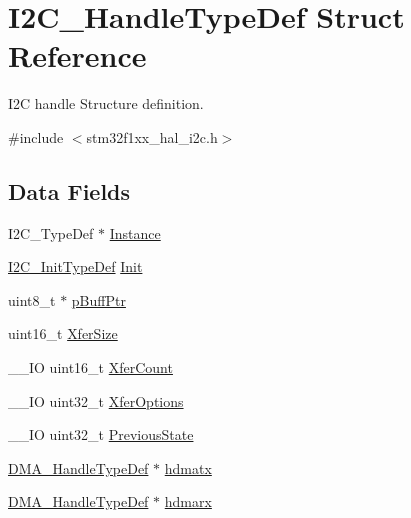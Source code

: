 \hypertarget{struct_i2_c___handle_type_def}{}\section{I2\+C\+\_\+\+Handle\+Type\+Def Struct Reference}
\label{struct_i2_c___handle_type_def}


I2C handle Structure definition.  




{\ttfamily \#include $<$stm32f1xx\+\_\+hal\+\_\+i2c.\+h$>$}

\subsection*{Data Fields}
\begin{DoxyCompactItemize}
\item 
I2\+C\+\_\+\+Type\+Def $\ast$ \hyperlink{struct_i2_c___handle_type_def_a8bdec20782b6b99587806437094c43d2}{Instance}
\item 
\hyperlink{struct_i2_c___init_type_def}{I2\+C\+\_\+\+Init\+Type\+Def} \hyperlink{struct_i2_c___handle_type_def_a4b1d65e692a280d15470a8184ed2f68a}{Init}
\item 
uint8\+\_\+t $\ast$ \hyperlink{struct_i2_c___handle_type_def_ae5b117ad14c78eb266b018fb972e315e}{p\+Buff\+Ptr}
\item 
uint16\+\_\+t \hyperlink{struct_i2_c___handle_type_def_a51999331ab800faccdb97383b39819dd}{Xfer\+Size}
\item 
\+\_\+\+\_\+\+IO uint16\+\_\+t \hyperlink{struct_i2_c___handle_type_def_a49bf3cd0e9bcb9f41f161663f513f405}{Xfer\+Count}
\item 
\+\_\+\+\_\+\+IO uint32\+\_\+t \hyperlink{struct_i2_c___handle_type_def_a275aa3c8180a03dbe4bf55fafba3e892}{Xfer\+Options}
\item 
\+\_\+\+\_\+\+IO uint32\+\_\+t \hyperlink{struct_i2_c___handle_type_def_aa74abfd1a56073ae8c2c826db1be0628}{Previous\+State}
\item 
\hyperlink{group___d_m_a___exported___types_ga92b907d56a9c29b93d46782a7a04f91e}{D\+M\+A\+\_\+\+Handle\+Type\+Def} $\ast$ \hyperlink{struct_i2_c___handle_type_def_a33e13c28b1a70e6164417abb026d7a22}{hdmatx}
\item 
\hyperlink{group___d_m_a___exported___types_ga92b907d56a9c29b93d46782a7a04f91e}{D\+M\+A\+\_\+\+Handle\+Type\+Def} $\ast$ \hyperlink{struct_i2_c___handle_type_def_abd0aeec20298a55d89a440320e35634f}{hdmarx}
\item 

\end{DoxyCompactItemize}
